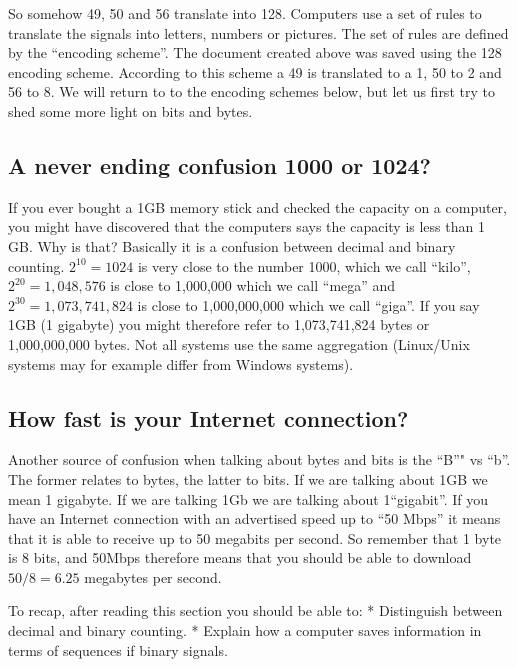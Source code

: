 \documentclass[]{book}
\begin{document}
So somehow 49, 50 and 56 translate into 128. Computers use a set of rules to translate the signals into letters, numbers or pictures. The set of rules are defined by the ``encoding scheme''. The document created above was saved using the 128 encoding scheme. According to this scheme a 49 is translated to a 1, 50 to 2 and 56 to 8. We will return to to the encoding schemes below, but let us first try to shed some more light on bits and bytes.

\hypertarget{a-never-ending-confusion-1000-or-1024}{%
\subsection{A never ending confusion 1000 or 1024?}\label{a-never-ending-confusion-1000-or-1024}}

If you ever bought a 1GB memory stick and checked the capacity on a computer, you might have discovered that the computers says the capacity is less than 1 GB. Why is that? Basically it is a confusion between decimal and binary counting. \(2^{10}=1024\) is very close to the number 1000, which we call ``kilo'', \(2^{20}=1,048,576\) is close to 1,000,000 which we call ``mega'' and \(2^{30}=1,073,741,824\) is close to 1,000,000,000 which we call ``giga''. If you say 1GB (1 gigabyte) you might therefore refer to 1,073,741,824 bytes or 1,000,000,000 bytes. Not all systems use the same aggregation (Linux/Unix systems may for example differ from Windows systems).

\hypertarget{how-fast-is-your-internet-connection}{%
\subsection{How fast is your Internet connection?}\label{how-fast-is-your-internet-connection}}

Another source of confusion when talking about bytes and bits is the ``B''" vs ``b''. The former relates to bytes, the latter to bits. If we are talking about 1GB we mean 1 gigabyte. If we are talking 1Gb we are talking about 1``gigabit''. If you have an Internet connection with an advertised speed up to ``50 Mbps'' it means that it is able to receive up to 50 megabits per second. So remember that 1 byte is 8 bits, and 50Mbps therefore means that you should be able to download \(50/8=6.25\) megabytes per second.

To recap, after reading this section you should be able to:
* Distinguish between decimal and binary counting.
* Explain how a computer saves information in terms of sequences if binary signals.
\end{document}
